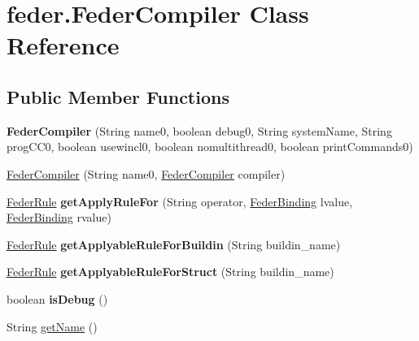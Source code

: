 \hypertarget{classfeder_1_1FederCompiler}{}\section{feder.\+Feder\+Compiler Class Reference}
\label{classfeder_1_1FederCompiler}
\subsection*{Public Member Functions}
\begin{DoxyCompactItemize}
\item 
\mbox{\label{classfeder_1_1FederCompiler_a1ed2c34c2f6ff52ca2a1d5e5bb79946a}} 
{\bfseries Feder\+Compiler} (String name0, boolean debug0, String system\+Name, String prog\+C\+C0, boolean usewincl0, boolean nomultithread0, boolean print\+Commands0)
\item 
\hyperlink{classfeder_1_1FederCompiler_a8038b27d1ee4bdd165242833646f721c}{Feder\+Compiler} (String name0, \hyperlink{classfeder_1_1FederCompiler}{Feder\+Compiler} compiler)
\item 
\mbox{\label{classfeder_1_1FederCompiler_a834ccd91bec2943484549f99ffabfd4c}} 
\hyperlink{classfeder_1_1types_1_1FederRule}{Feder\+Rule} {\bfseries get\+Apply\+Rule\+For} (String operator, \hyperlink{classfeder_1_1types_1_1FederBinding}{Feder\+Binding} lvalue, \hyperlink{classfeder_1_1types_1_1FederBinding}{Feder\+Binding} rvalue)
\item 
\mbox{\label{classfeder_1_1FederCompiler_a18fd3fb928f7ac1ab8216fc26feb01cc}} 
\hyperlink{classfeder_1_1types_1_1FederRule}{Feder\+Rule} {\bfseries get\+Applyable\+Rule\+For\+Buildin} (String buildin\+\_\+name)
\item 
\mbox{\label{classfeder_1_1FederCompiler_aa482c1a916e0cf8bf02fdd729be6d14c}} 
\hyperlink{classfeder_1_1types_1_1FederRule}{Feder\+Rule} {\bfseries get\+Applyable\+Rule\+For\+Struct} (String buildin\+\_\+name)
\item 
\mbox{\label{classfeder_1_1FederCompiler_a37e5e6ebae74b840de0a1697ce8a3d55}} 
boolean {\bfseries is\+Debug} ()
\item 
String \hyperlink{classfeder_1_1FederCompiler_a4ae5a5159ac30049c08879dfca2fe308}{get\+Name} ()

\end{DoxyCompactItemize}
